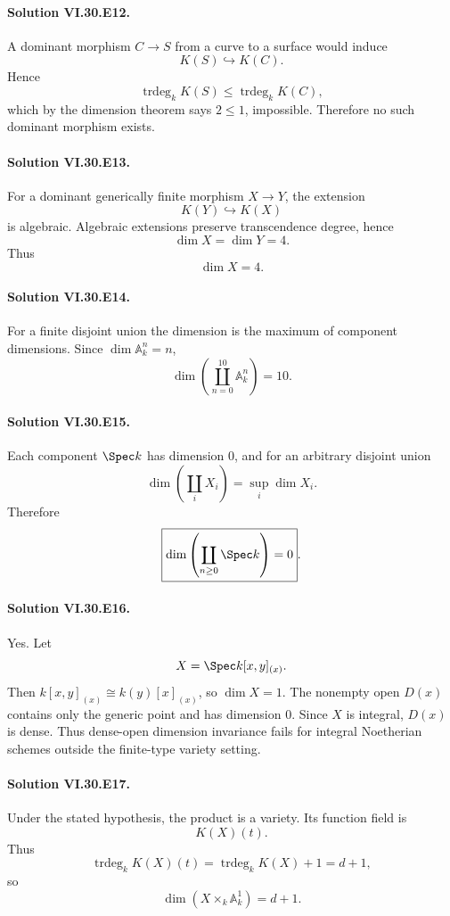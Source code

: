 \paragraph{Solution VI.30.E12.}
A dominant morphism \(C\to S\) from a curve to a surface would induce
\[
K(S)\hookrightarrow K(C).
\]
Hence
\[
\operatorname{trdeg}_kK(S)\le\operatorname{trdeg}_kK(C),
\]
which by the dimension theorem says \(2\le1\), impossible. Therefore no such dominant morphism exists.

\paragraph{Solution VI.30.E13.}
For a dominant generically finite morphism \(X\to Y\), the extension
\[
K(Y)\hookrightarrow K(X)
\]
is algebraic. Algebraic extensions preserve transcendence degree, hence
\[
\dim X=\dim Y=4.
\]
Thus
\[
\boxed{\dim X=4}.
\]

\paragraph{Solution VI.30.E14.}
For a finite disjoint union the dimension is the maximum of component dimensions. Since
\(\dim\mathbb A^n_k=n\),
\[
\boxed{\dim\left(\coprod_{n=0}^{10}\mathbb A^n_k\right)=10}.
\]

\paragraph{Solution VI.30.E15.}
Each component \(\Spec k\) has dimension \(0\), and for an arbitrary disjoint union
\[
\dim\left(\coprod_iX_i\right)=\sup_i\dim X_i.
\]
Therefore
\[
\boxed{\dim\left(\coprod_{n\ge0}\Spec k\right)=0}.
\]

\paragraph{Solution VI.30.E16.}
Yes. Let
\[
X=\Spec k[x,y]_{(x)}.
\]
Then \(k[x,y]_{(x)}\cong k(y)[x]_{(x)}\), so \(\dim X=1\). The nonempty open \(D(x)\)
contains only the generic point and has dimension \(0\). Since \(X\) is integral, \(D(x)\) is dense.
Thus dense-open dimension invariance fails for integral Noetherian schemes outside the finite-type variety setting.

\paragraph{Solution VI.30.E17.}
Under the stated hypothesis, the product is a variety. Its function field is
\[
K(X)(t).
\]
Thus
\[
\operatorname{trdeg}_kK(X)(t)=\operatorname{trdeg}_kK(X)+1=d+1,
\]
so
\[
\boxed{\dim(X\times_k\mathbb A^1_k)=d+1}.
\]

